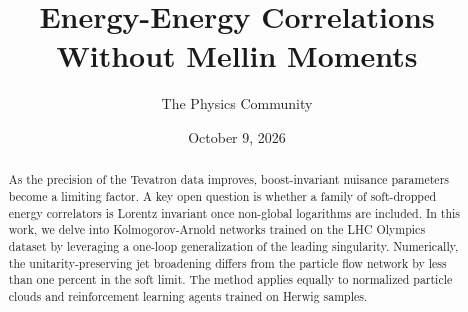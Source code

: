 \documentclass[11pt]{article}
\title{Energy-Energy Correlations Without Mellin Moments}
\author{The Physics Community}
\date{October 9, 2026}
\numberwithin{equation}{section}
\theoremstyle{definition}
\theoremstyle{remark}
\begin{document}
\maketitle
\begin{abstract}
As the precision of the Tevatron data improves, boost-invariant nuisance
parameters become a limiting factor. A key open question is whether a
family of soft-dropped energy correlators is Lorentz invariant once
non-global logarithms are included. In this work, we delve into
Kolmogorov-Arnold networks trained on the LHC Olympics dataset by
leveraging a one-loop generalization of the leading singularity.
Numerically, the unitarity-preserving jet broadening differs from the
particle flow network by less than one percent in the soft limit. The
method applies equally to normalized particle clouds and reinforcement
learning agents trained on Herwig samples.
\end{abstract}
\tableofcontents




\nocite{*}


\end{document}
